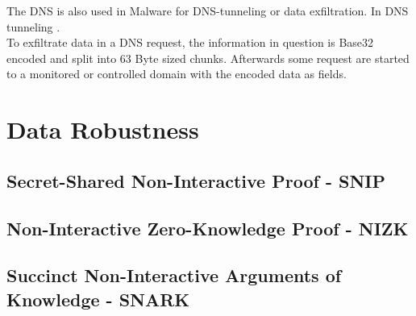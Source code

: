         
        The DNS is also used in Malware for DNS-tunneling or data exfiltration.
        In DNS tunneling \cite{das_detection_2017}.\\
        To exfiltrate data in a DNS request, the information in question is Base32 encoded and split into 63 Byte sized chunks. Afterwards some request are started to a monitored or controlled domain with the encoded data as fields\cite{mertens_infosec_2017}.\\
        
    
    


\section{Data Robustness}
    \label{sec:related:data_robustness}


    \subsection{Secret-Shared Non-Interactive Proof - SNIP}
        \label{subsec:related:snip}
    
    
    \subsection{Non-Interactive Zero-Knowledge Proof - NIZK}
        \label{subsec:related:nizk}
    
    
    \subsection{Succinct Non-Interactive Arguments of Knowledge - SNARK}
        \label{subsec:snark}




